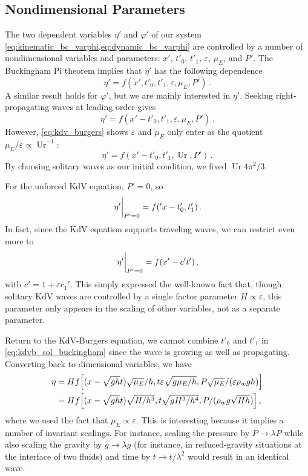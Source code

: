 \documentclass{jfm}
\let\Oldsubsection\subsection
\renewcommand{\subsection}{\FloatBarrier\Oldsubsection}
\DeclareMathOperator{\Ur}{Ur}
\renewcommand*{\epsilon}{\varepsilon}
\begin{document}
\subsection{Nondimensional Parameters}
The two dependent variables $\eta'$ and $\varphi'$ of our system
\cref{eq:kinematic_bc_varphi,eq:dynamic_bc_varphi} are controlled by a
number of nondimensional variables and parameters: $x'$, $t'_0$, $t'_1$,
$\epsilon$, $\mu_E$, and $P'$.
The Buckingham Pi theorem implies that $\eta'$ has the following
dependence
\begin{equation}
  \eta' = f(x', t'_0, t'_1, \epsilon, \mu_E, P') \,.
\end{equation}
A similar result holds for $\varphi'$, but we are mainly interested in
$\eta'$.
Seeking right-propagating waves at leading order gives
\begin{equation}
  \eta' = f(x'-t'_0, t'_1, \epsilon, \mu_E, P') \,.
\end{equation}
However, \cref{eq:kdv_burgers} shows $\epsilon$ and $\mu_E$ only enter as
the quotient $\mu_E/\epsilon \propto \Ur^{-1}$:
\begin{equation}
  \eta' = f(x'-t'_0, t'_1, \Ur, P') \,.
  \label{eq:kdvb_sol_buckingham}
\end{equation}
By choosing solitary waves as our initial condition, we fixed $\Ur
4\pi^2/3$.

For the unforced KdV equation, $P'=0$, so
\begin{equation}
  \eval{\eta'}_{P'=0} = f('x - t'_0, t'_1) \,.
\end{equation}
In fact, since the KdV equation supports traveling waves, we can
restrict even more to
\begin{equation}
  \eval{\eta'}_{P'=0} = f(x'-c' t') \,,
\end{equation}
with $c' = 1 + \epsilon c_1'$.
This simply expressed the well-known fact that, though solitary KdV
waves are controlled by a single factor parameter $H \propto \epsilon$,
this parameter only appears in the scaling of other variables, \ie not
as a separate parameter.

Return to the KdV-Burgers equation, we cannot combine $t'_0$ and $t'_1$
in \cref{eq:kdvb_sol_buckingham} since the wave is growing as well as
propagating.
Converting back to dimensional variables, we have
\begin{equation}
  \begin{split}
    \eta &= H f\bqty{(x - \sqrt{gh} t) \sqrt{\mu_E}/h, t \epsilon \sqrt{g
      \mu_E/h}, P \sqrt{\mu_E}/(\epsilon \rho_w g h)} \\
    &= H f\bqty{(x - \sqrt{gh}t) \sqrt{H/h^3}, t \sqrt{g H^3/h^4}, P /(\rho_w
      g \sqrt{H h})} \,,
  \end{split}
\end{equation}
where we used the fact that $\mu_E \propto \epsilon$.
This is interesting because it implies a number of invariant scalings.
For instance, scaling the pressure by $P \to \lambda P$ while also
scaling the gravity by $g \to \lambda g$ (for instance, in
reduced-gravity situations at the interface of two fluids) and time by
$t \to t/\lambda^2$ would result in an identical wave.
\end{document}
